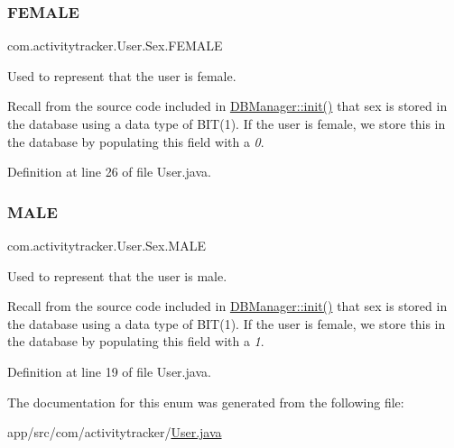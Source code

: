 \subsubsection{\texorpdfstring{F\+E\+M\+A\+LE}{FEMALE}}
{\footnotesize\ttfamily com.\+activitytracker.\+User.\+Sex.\+F\+E\+M\+A\+LE}

Used to represent that the user is female.

Recall from the source code included in \mbox{\hyperlink{classcom_1_1activitytracker_1_1_d_b_manager_a41df4600bb5901a26a4ea6a7108a70b9}{D\+B\+Manager\+::init()}} that sex is stored in the database using a data type of B\+I\+T(1). If the user is female, we store this in the database by populating this field with a {\itshape 0}. 

Definition at line 26 of file User.\+java.

\mbox{\label{enumcom_1_1activitytracker_1_1_user_1_1_sex_ad3b626a38bd4615eb621d75b939f412d}} 
\subsubsection{\texorpdfstring{M\+A\+LE}{MALE}}
{\footnotesize\ttfamily com.\+activitytracker.\+User.\+Sex.\+M\+A\+LE}

Used to represent that the user is male.

Recall from the source code included in \mbox{\hyperlink{classcom_1_1activitytracker_1_1_d_b_manager_a41df4600bb5901a26a4ea6a7108a70b9}{D\+B\+Manager\+::init()}} that sex is stored in the database using a data type of B\+I\+T(1). If the user is female, we store this in the database by populating this field with a {\itshape 1}. 

Definition at line 19 of file User.\+java.



The documentation for this enum was generated from the following file\+:\begin{DoxyCompactItemize}
\item 
app/src/com/activitytracker/\mbox{\hyperlink{_user_8java}{User.\+java}}\end{DoxyCompactItemize}
